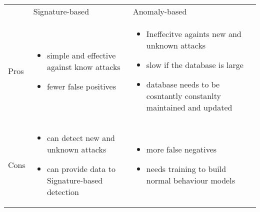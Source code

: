 \begin{tabular}{|L{1.2cm}C{7cm}R{7cm}|}  %
	\hline
	& Signature-based & Anomaly-based \\
	Pros &
	\firmlist
	\begin{itemize}
		\item simple and effective against know attacks
		\item fewer false positives
	\end{itemize}
	&
	\firmlist
	\begin{itemize}
		\item Ineffecitve againts new and unknown attacks
		\item slow if the database is large
		\item database needs to be cosntantly constanlty maintained and updated
	\end{itemize}
	\\

	Cons &
	\firmlist
	\begin{itemize}
		\item can detect new and unknown attacks
		\item can provide data to Signature-based detection
	\end{itemize}
	&
	\firmlist
	\begin{itemize}
		\item more false negatives
		\item needs training to build normal behaviour models
	\end{itemize}
	\\
	\hline
\end{tabular}